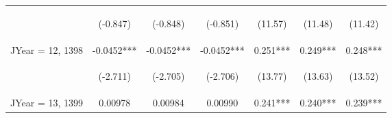 \documentclass{standalone}
\begin{document}
\begin{tabular}{lcccccc}
    \vspace{4pt}     & \begin{footnotesize}(-0.847)\end{footnotesize}  & \begin{footnotesize}(-0.848)\end{footnotesize}  & \begin{footnotesize}(-0.851)\end{footnotesize}  & \begin{footnotesize}(11.57)\end{footnotesize}  & \begin{footnotesize}(11.48)\end{footnotesize}  & \begin{footnotesize}(11.42)\end{footnotesize}  \\
    JYear = 12, 1398 & -0.0452***                                      & -0.0452***                                      & -0.0452***                                      & 0.251***                                       & 0.249***                                       & 0.248***                                       \\
    \vspace{4pt}     & \begin{footnotesize}(-2.711)\end{footnotesize}  & \begin{footnotesize}(-2.705)\end{footnotesize}  & \begin{footnotesize}(-2.706)\end{footnotesize}  & \begin{footnotesize}(13.77)\end{footnotesize}  & \begin{footnotesize}(13.63)\end{footnotesize}  & \begin{footnotesize}(13.52)\end{footnotesize}  \\
    JYear = 13, 1399 & 0.00978                                         & 0.00984                                         & 0.00990                                         & 0.241***                                       & 0.240***                                       & 0.239***                                       \\

\end{tabular}
\end{document}
